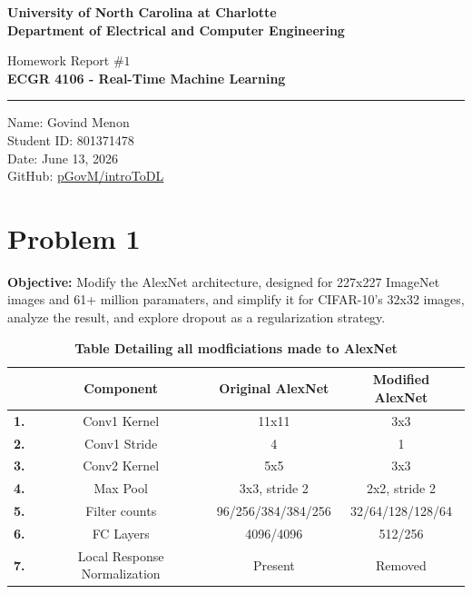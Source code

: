 \documentclass[a4paper]{article}
\begin{document}
\begin{titlepage}
    \thispagestyle{fancy}
    \renewcommand{\headrulewidth}{0pt}
    \begin{center}
        \vspace*{2cm}

        \LARGE\textbf{University of North Carolina at Charlotte\\
                        Department of Electrical and Computer Engineering}
        
        \vspace*{4cm}

        Homework Report $\# 1$ \\
        \Large\textbf{ECGR 4106 - Real-Time Machine Learning} \\
        
        \noindent\rule{14cm}{0.4pt}

        \vspace*{3cm}

        Name: Govind Menon \\
        Student ID: 801371478 \\
        Date: June 13, 2026 \\
        GitHub: \href{https://github.com/pGovm/introToDL.git}{pGovM/introToDL}

    \end{center}
\end{titlepage}

\section*{\textbf{Problem 1}}

\textbf{Objective:} Modify the AlexNet architecture, designed for 227x227 ImageNet images and 61+ million paramaters, and simplify it for CIFAR-10's 32x32 images, analyze the result, and explore dropout as a regularization strategy.

\begin{table}[H]
    \centering
    \label{tab:alexChanges}
    \caption{\textbf{Table Detailing all modficiations made to AlexNet}}
    \begin{tabular}{| c || c | c | c |}
        \hline 
        & \textbf{Component} & \textbf{Original AlexNet} & \textbf{Modified AlexNet} \\
        \hline
        \textbf{1.} & Conv1 Kernel & 11x11 & 3x3 \\
        \hline
        \textbf{2.} & Conv1 Stride & 4 & 1 \\
        \hline
        \textbf{3.} & Conv2 Kernel & 5x5 & 3x3 \\
        \hline
        \textbf{4.} & Max Pool & 3x3, stride 2 & 2x2, stride 2 \\
        \hline
        \textbf{5.} & Filter counts & 96/256/384/384/256 & 32/64/128/128/64 \\
        \hline
        \textbf{6.} & FC Layers & 4096/4096 & 512/256 \\
        \hline
        \textbf{7.} & Local Response Normalization & Present & Removed \\
        \hline
    \end{tabular}
\end{table}
\end{document}
